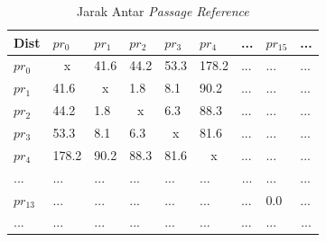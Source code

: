 \documentclass[../Book.tex]{subfiles}
\begin{document}
	\begin{table}[H]
		\centering
		\caption{Jarak Antar \textit{Passage Reference}}
		\label{prxpr}
		\begin{tabular}{l|llllllll}
			Dist      & $pr_{0}$              & $pr_{1}$              & $pr_{2}$              & $pr_{3}$              & $pr_{4}$              & ...                     & $pr_{15}$               & ...                     \\ \hline
			$pr_{0}$  & \multicolumn{1}{c}{x} & 41.6                  & 44.2                  & 53.3                  & 178.2                 & ...                     & ...                     & ...                     \\
			$pr_{1}$  & 41.6                  & \multicolumn{1}{c}{x} & 1.8                   & 8.1                   & 90.2                  & ...                     & ...                     & ...                     \\
			$pr_{2}$  & 44.2                  & 1.8                   & \multicolumn{1}{c}{x} & 6.3                   & 88.3                  & ...                     & ...                     & ...                     \\
			$pr_{3}$  & 53.3                  & 8.1                   & 6.3                   & \multicolumn{1}{c}{x} & 81.6                  & ...                     & ...                     & ...                     \\
			$pr_{4}$  & 178.2                 & 90.2                  & 88.3                  & 81.6                  & \multicolumn{1}{c}{x} & ...                     & ...                     & ...                     \\
			...       & ...                   & ...                   & ...                   & ...                   & ...                   & \multicolumn{1}{c}{...} & ...                     & ...                     \\
			$pr_{13}$ & ...                   & ...                   & ...                   & ...                   & ...                   & ...                     & {\color[HTML]{FE0000} 0.0} & ...                     \\
			...       & ...                   & ...                   & ...                   & ...                   & ...                   & ...                     & ...                     & \multicolumn{1}{c}{...}
		\end{tabular}
	\end{table}
\end{document}
